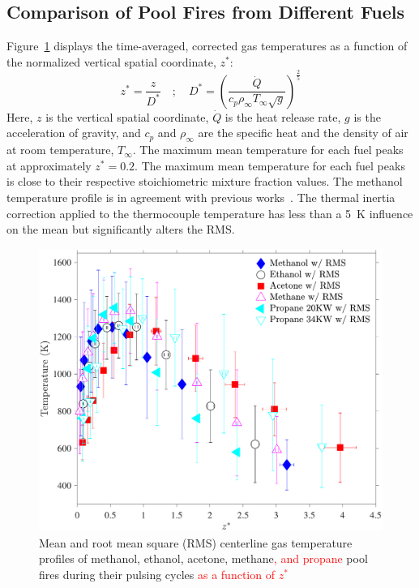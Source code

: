 \documentclass[12pt]{article}
\begin{document}
\subsection{Comparison of Pool Fires from Different Fuels}
\label{ssec:Fuel_comp}

Figure~\ref{fig:Temp_Comparison} displays the time-averaged, corrected gas temperatures as a function of the normalized vertical spatial coordinate, $z^*$:
\begin{equation}\label{eq:Z_Star}
z^*=\frac{z}{D^*}  \quad ; \quad  D^* = \left(\frac{\dot{Q}}{c_{p}\rho_\infty T_\infty \sqrt{g}}\right)^{\frac{2}{5}}
\end{equation}
Here, $z$ is the vertical spatial coordinate, $\dot{Q}$ is the heat release rate, $g$ is the acceleration of gravity, and $c_p$ and $\rho_\infty$ are the specific heat and the density of air at room temperature, $T_\infty$. The maximum mean temperature for each fuel peaks at approximately $z^*=0.2$. The maximum mean temperature for each fuel peaks is close to their respective stoichiometric mixture fraction values. The methanol temperature profile is in agreement with previous works~\cite{Wang2019}. The thermal inertia correction applied to the thermocouple temperature has less than a 5~K influence on the mean but significantly alters the RMS.

\begin{figure}[h!]
	\centering
\includegraphics[width=10.0 cm, keepaspectratio]{Temperature_Comparison.pdf}
	\caption[Mean and RMS centerline gas temperature profiles]{Mean and root mean square (RMS) centerline gas temperature profiles of methanol, ethanol, acetone, methane\textcolor{red}{, and propane} pool fires during their pulsing cycles \textcolor{red}{ as a function of $z^*$}}
	\label{fig:Temp_Comparison}
\end{figure}
\end{document}

